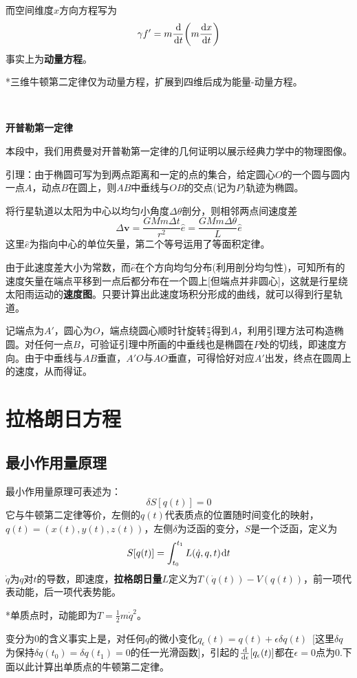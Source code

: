 \documentclass[a4paper,UTF8,fontset=windows]{ctexart}
\newcommand*{\dr}{\hspace{0.07em}\mathrm{d}}
\begin{document}
而空间维度$x$方向方程写为
$$\gamma f'=m\frac{\dr}{\dr t}\bigg(m\frac{\dr x}{\dr t}\bigg)$$
事实上为\textbf{动量方程}。

*三维牛顿第二定律仅为动量方程，扩展到四维后成为能量-动量方程。

\

\textbf{开普勒第一定律}

本段中，我们用费曼对开普勒第一定律的几何证明以展示经典力学中的物理图像。

引理：由于椭圆可写为到两点距离和一定的点的集合，给定圆心$O$的一个圆与圆内一点$A$，动点$B$在圆上，则$AB$中垂线与$OB$的交点(记为$P$)轨迹为椭圆。

将行星轨道以太阳为中心以均匀小角度$\Delta\theta$剖分，则相邻两点间速度差
$$\Delta\mathbf{v}=\frac{GMm\Delta t}{r^2}\hat{e}=\frac{GMm\Delta\theta}{L}\hat{e}$$
这里$\hat{e}$为指向中心的单位矢量，第二个等号运用了等面积定律。

由于此速度差大小为常数，而$\hat{e}$在个方向均匀分布(利用剖分均匀性)，可知所有的速度矢量在端点平移到一点后都分布在一个圆上[但端点并非圆心]，这就是行星绕太阳雨运动的\textbf{速度图}。只要计算出此速度场积分形成的曲线，就可以得到行星轨道。

记端点为$A'$，圆心为$O$，端点绕圆心顺时针旋转$\frac{\pi}{2}$得到$A$，利用引理方法可构造椭圆。对任何一点$B$，可验证引理中所画的中垂线也是椭圆在$P$处的切线，即速度方向。由于中垂线与$AB$垂直，$A'O$与$AO$垂直，可得恰好对应$A'$出发，终点在圆周上的速度，从而得证。

\section{拉格朗日方程}
\subsection{最小作用量原理}
最小作用量原理可表述为：
$$\delta S[q(t)]=0$$
它与牛顿第二定律等价，左侧的$q(t)$代表质点的位置随时间变化的映射，$q(t)=(x(t),y(t),z(t))$，左侧$\delta$为泛函的变分，$S$是一个泛函，定义为
$$S[q(t)]=\int_{t_0}^{t_1}L(\dot{q},q,t)\dr t$$
$\dot{q}$为$q$对$t$的导数，即速度，\textbf{拉格朗日量}$L$定义为$T(\dot{q}(t))-V(q(t))$，前一项代表动能，后一项代表势能。

*单质点时，动能即为$T=\frac{1}{2}m\dot{q}^2$。

变分为0的含义事实上是，对任何$q$的微小变化$q_\epsilon(t)=q(t)+\epsilon\delta q(t)$\ [这里$\delta q$为保持$\delta q(t_0)=\delta q(t_1)=0$的任一光滑函数]，引起的$\frac{\dr}{\dr\epsilon}[q_\epsilon(t)]$都在$\epsilon=0$点为0.下面以此计算出单质点的牛顿第二定律。
\end{document}
